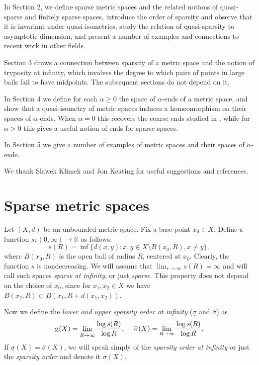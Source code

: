 \documentclass[12pt]{amsart}
\theoremstyle{definition}
\theoremstyle{remark}
\numberwithin{equation}{section}
\newcommand{\R}{\mathbb{R}}
\newcommand{\ls}{\underline{\sigma}}
\newcommand{\us}{\overline{\sigma}}
\newcommand{\aend}{$\alpha$-end}
\begin{document}
In Section 2, we define sparse metric spaces and the related notions
of quasi-sparse and finitely sparse spaces, introduce the order of
sparsity and observe that it is invariant under quasi-isometries,
study the relation of quasi-sparsity to asymptotic dimension, and
present a number of examples and connections to recent work in other
fields.

Section 3 draws a connection between sparsity of a metric space and
the notion of tryposity at infinity, which involves the degree to
which pairs of points in large balls fail to have midpoints. The subsequent
sections do not depend on it.

In Section 4 we define for each $\alpha \ge 0$ the space of \aend s of
a metric space, and show that a quasi-isometry of metric spaces
induces a homeomorphism on their spaces of \aend s. When $\alpha = 0$
this recovers the coarse ends studied in \cite{AC}, while for $\alpha > 0$
this gives a useful notion of ends for sparse spaces.

In Section 5 we give a number of examples of metric spaces and their
spaces of \aend s.

We thank Slawek Klimek and Jon Keating for useful suggestions and
references.


\section{Sparse metric spaces}\label{spaces}

Let $(X,d)$ be an unbounded metric space. Fix a base point $x_0\in X$.
Define a function $s:(0,\infty)\to\R$ as follows:
\begin{equation*}
s(R)=\inf\{d(x,y):x,y\in X\setminus B(x_0,R), x\ne y\},
\end{equation*}
where $B(x_0,R)$ is the open ball of radius $R$, centered at $x_0$.
Clearly, the function $s$ is nondecreasing. We will assume that
$\lim_{r\to\infty}s(R)=\infty$ and will call such spaces \emph{sparse
  at infinity}, or just {\em sparse}. This property does not depend on
the choice of $x_0$, since for $x_1,x_2\in X$ we have $B(x_2,R)\subset
B(x_1,R+d(x_1,x_2))$.

Now we define the \emph{lower and upper sparsity order at infinity}
($\ls$ and $\us$) as
\begin{equation*}
\ls(X)=\varliminf_{R\to\infty}\frac{\log s(R)}{\log R},\ \ \ \
\us(X)=\varlimsup_{R\to\infty}\frac{\log s(R)}{\log R}.
\end{equation*}
If $\ls(X)=\us(X)$, we will speak simply of the \emph{sparsity order
  at infinity} or just the \emph{sparsity order} and denote it
$\sigma(X)$.
\end{document}
